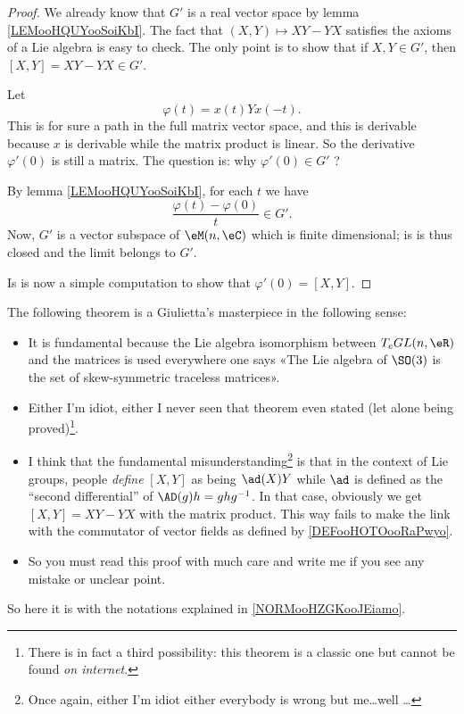 \begin{proof}
    We already know that \( G'\) is a real vector space by lemma \ref{LEMooHQUYooSoiKbI}. The fact that \( (X,Y)\mapsto XY-YX\) satisfies the axioms of a Lie algebra is easy to check. The only point is to show that if \( X,Y\in G'\), then \( [X,Y]=XY-YX\in G'\).

    Let
    \begin{equation}        \label{EQooJDTLooGWsDiq}
        \varphi(t)=x(t)Yx(-t).
    \end{equation}
    This is for sure a path in the full matrix vector space, and this is derivable because \( x\) is derivable while the matrix product is linear. So the derivative \( \varphi'(0)\) is still a matrix. The question is: why \( \varphi'(0)\in G'\) ?

    By lemma \ref{LEMooHQUYooSoiKbI}, for each \( t\) we have
    \begin{equation}
        \frac{ \varphi(t)-\varphi(0) }{ t }\in G'.
    \end{equation}
    Now, \( G'\) is a vector subspace of \( \eM(n,\eC)\) which is finite dimensional; is is thus closed and the limit belongs to \( G'\).

    Is is now a simple computation to show that \( \varphi'(0)=[X,Y]\).
\end{proof}

\begin{normaltext}
The following theorem is a Giulietta's masterpiece in the following sense:
\begin{itemize}
    \item It is fundamental because the Lie algebra isomorphism between \( T_eGL(n,\eR)\) and the matrices is used everywhere one says «The Lie algebra of $\SO(3)$ is the set of skew-symmetric traceless matrices».
    \item
        Either I'm idiot, either I never seen that theorem even stated (let alone being proved)\footnote{There is in fact a third possibility:  this theorem is a classic one but cannot be found \emph{on internet}.}.
    \item
        I think that the fundamental misunderstanding\footnote{Once again, either I'm idiot either everybody is wrong but me\ldots well \ldots} is that in the context of Lie groups, people \emph{define} \( [X,Y]\) as being \( \ad(X)Y\) while \( \ad\) is defined as the ``second differential'' of \( \AD(g)h=ghg^{-1}\). In that case, obviously we get \( [X,Y]=XY-YX\) with the matrix product. This way fails to make the link with the commutator of vector fields as defined by \ref{DEFooHOTOooRaPwyo}.
    \item
        So you must read this proof with much care and write me if you see any mistake or unclear point.
\end{itemize}
\end{normaltext}
So here it is with the notations explained in \ref{NORMooHZGKooJEiamo}.
    

